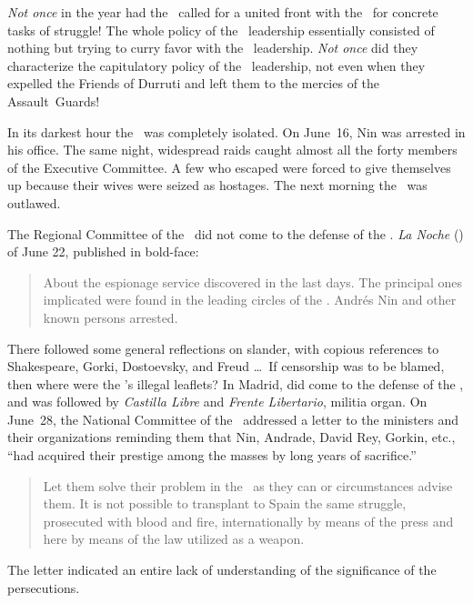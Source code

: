 \emph{Not once} in the year had the \POUM\ called for a united front with the \CNT\ for concrete tasks of struggle! The whole policy of the \POUM\ leadership essentially consisted of nothing but trying to curry favor with the \CNT\ leadership. \emph{Not once} did they characterize the capitulatory policy of the \CNT\ leadership, not even when they expelled the Friends of Durruti and left them to the mercies of the Assault~Guards!

In its darkest hour the \POUM\ was completely isolated. On June~16, Nin{\indexANin} was arrested in his office. The same night, widespread raids caught almost all the forty members of the Executive Committee. A few who escaped were forced to give themselves up because their wives were seized as hostages. The next morning the \POUM\ was outlawed.

The Regional Committee of the \CNT\ did not come to the defense of the \POUM. \emph{La Noche} (\CNT) of June 22, published in bold-face:

\begin{quotation}
  About the espionage service discovered in the last days. The principal ones implicated were found in the leading circles of the \POUM. Andr\'es Nin and other known persons arrested.
\end{quotation}

There followed some general reflections on slander, with copious references to Shakespeare, Gorki, Dostoevsky, and Freud \dots\ If censorship was to be blamed, then where were the \CNT’s illegal leaflets? In Madrid, \emph{\CNT} did come to the defense of the \POUM, and was followed by \emph{Castilla Libre} and \emph{Frente Libertario}, militia organ. On June~28, the National Committee of the \CNT\ addressed a letter to the ministers and their organizations reminding them that Nin, Andrade, David Rey, Gorkin, etc., ``had acquired their prestige among the masses by long years of sacrifice.''

\begin{quotation}
  Let them solve their problem in the \USSR\ as they can or circumstances advise them. It is not possible to transplant to Spain the same struggle, prosecuted with blood and fire, internationally by means of the press and here by means of the law utilized as a weapon.
\end{quotation}

The letter indicated an entire lack of understanding of the significance of the persecutions.

